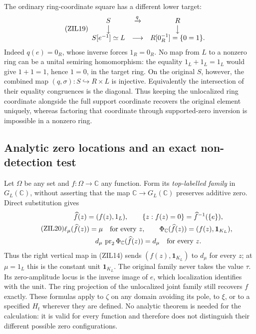 The ordinary ring-coordinate square has a different lower target:
\begin{equation}\tag{ZIL19}
\begin{array}{ccc}
 S&\xrightarrow{q}&R\\
 \big\downarrow&&\big\downarrow\\
 S[e^{-1}]\simeq L&\longrightarrow&R[0_R^{-1}]=\{0=1\}.
\end{array}
\end{equation}
Indeed $q(e)=0_R$, whose inverse forces $1_R=0_R$.
No map from $L$ to a nonzero ring can be a unital semiring
homomorphism: the equality $1_L+1_L=1_L$ would give $1+1=1$,
hence $1=0$, in the target ring. On the original $S$, however,
the combined map $(q,\sigma):S\hookrightarrow R\times L$
is injective. Equivalently the intersection of their equality
congruences is the diagonal. Thus keeping the unlocalized ring
coordinate alongside the full support coordinate recovers the
original element uniquely, whereas factoring that coordinate
through supported-zero inversion is impossible in a nonzero ring.

\subsection{Analytic zero locations and an exact non-detection test}

Let $\Omega$ be any set and $f:\Omega\to\mathbb C$ any function.
Form its \emph{top-labelled family} in $G_L(\mathbb C)$,
without asserting that the map $\mathbb C\to G_L(\mathbb C)$
preserves additive zero. Direct substitution gives
\begin{equation}\tag{ZIL20}
 \begin{gathered}
 \widehat f(z)=(f(z),1_L),\qquad
 \{z:f(z)=0\}=\widehat f^{-1}(\{e\}),\\
 \ell_\mu(\widehat f(z))=\mu\quad\hbox{for every }z,\qquad
 \Phi_{\mathbb C}(\widehat f(z))=(f(z),\mathbf1_{K_L}),\\
 d_\mu\,\operatorname{pr}_2\Phi_{\mathbb C}(\widehat f(z))
       =d_\mu\quad\hbox{for every }z.
 \end{gathered}
\end{equation}
Thus the right vertical map in (ZIL14) sends
$(f(z),\mathbf1_{K_L})$ to $d_\mu$ for every $z$;
at $\mu=1_L$ this is the constant unit $\mathbf1_{K_L}$.
The original family never takes the value $\tau$.
Its zero-amplitude locus is the inverse image of $e$, which
localization identifies with the unit. The ring projection of
the unlocalized joint family still recovers $f$ exactly.
These formulas apply to $\zeta$ on any domain avoiding its pole,
to $\xi$, or to a specified $H_t$ wherever they are defined.
No analytic theorem is needed for the calculation: it is valid
for every function and therefore does not distinguish their
different possible zero configurations.

